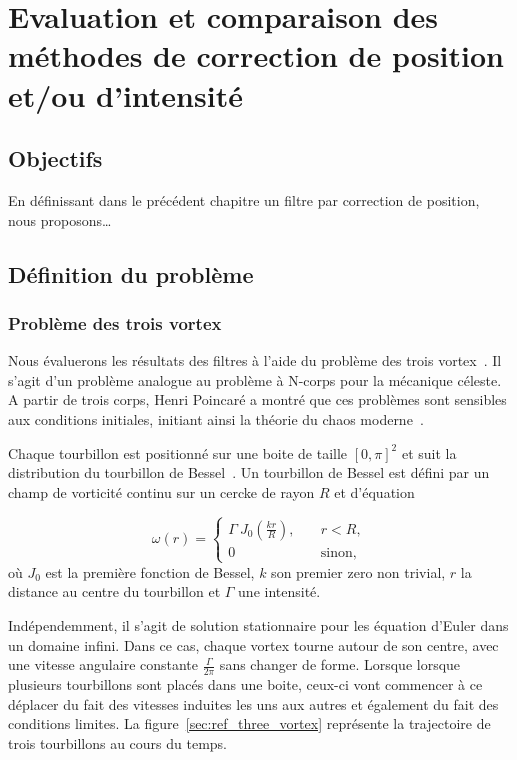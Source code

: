 
\chapter{Evaluation et comparaison des méthodes de correction de position et/ou d'intensité}

\section{Objectifs}

En définissant dans le précédent chapitre un filtre par correction de position, nous proposons\dots

\section{Définition du problème}
\subsection{Problème des trois vortex}

Nous évaluerons les résultats des filtres à l'aide du problème des trois vortex~\cite{aref_motion_1979,yim_motion_2022}. Il s'agit d'un problème analogue au problème à N-corps pour la mécanique céleste. A partir de trois corps, Henri Poincaré a montré que ces problèmes sont sensibles aux conditions initiales, initiant ainsi la théorie du chaos moderne~\cite{poincare1890,diacu1996}.

Chaque tourbillon est positionné sur une boite de taille $[0, \pi]^2$  et suit la distribution du tourbillon de Bessel~\cite{vanGeffen1996}. Un tourbillon de Bessel est défini par un champ de vorticité continu sur un cercke de rayon $R$ et d'équation

\begin{equation*}
    \omega(r) =  \begin{cases}
        \Gamma ~ J_0\left(\frac{k  r}{ R}\right),   \quad & r < R,        \\
        0 \quad                                           & \text{sinon},
    \end{cases}
\end{equation*}où $J_0$ est la première fonction de Bessel, $k$ son premier zero non trivial, $r$ la distance au centre du tourbillon et $\Gamma$ une intensité.

Indépendemment, il s'agit de solution stationnaire pour les équation d'Euler dans un domaine infini. Dans ce cas, chaque vortex tourne autour de son centre, avec une vitesse angulaire constante $\frac{\Gamma}{2\pi}$ sans changer de forme. Lorsque lorsque plusieurs tourbillons sont placés dans une boite, ceux-ci vont commencer à ce déplacer du fait des vitesses induites les uns aux autres et également du fait des conditions limites. La figure~\ref{sec:ref_three_vortex} représente la trajectoire de trois tourbillons au cours du temps.

